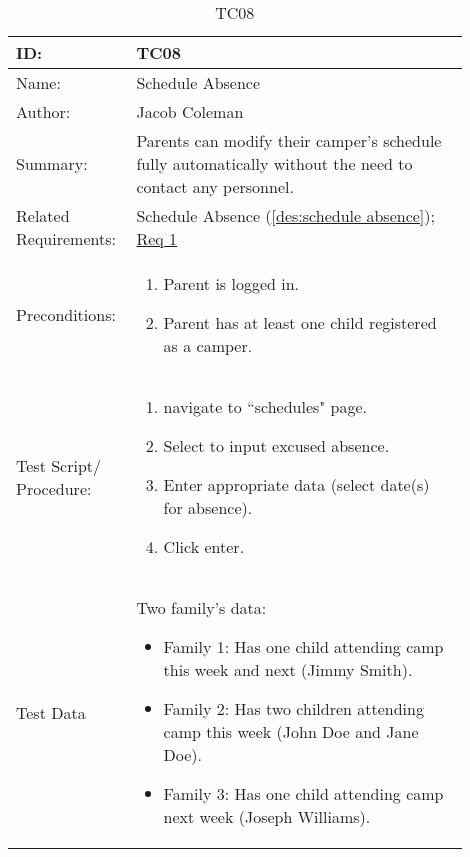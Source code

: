 \documentclass[11pt]{article}
\begin{document}
\begin{table}[H]
\begin{center}
\caption{TC08}
\label{TC08}
\begin{tabular}{p{0.20\linewidth}p{0.70\linewidth}}
	ID: & TC08\\\hline
	Name: & Schedule Absence \\\hline
	Author: & Jacob Coleman\\\hline
	Summary: & Parents can modify their camper's schedule fully automatically without the need to contact any personnel. \\\hline
	Related \hspace{5em} Requirements:& Schedule Absence (\cref{des:schedule absence}); \hyperlink{Req1}{Req 1}\\\hline
	Preconditions:& \begin{enumerate}[topsep=0pt] 
		\item Parent is logged in.
		\item Parent has at least one child registered as a camper.
	\end{enumerate}\\\hline
	Test Script/ Procedure: & \begin{enumerate}[topsep=0pt]
	\item navigate to ``schedules" page.
	\item Select to input excused absence.
	\item Enter appropriate data (select date(s) for absence).
	\item Click enter.
	\end{enumerate}\\\hline
	Test Data & \vspace*{.25em} Two family's data:
	\begin{itemize}[topsep=0pt]
		\item Family 1: Has one child attending camp this week and next (Jimmy Smith).
		\item Family 2: Has two children attending camp this week (John Doe and Jane Doe).
		\item Family 3: Has one child attending camp next week (Joseph Williams).
	\end{itemize}
\end{tabular}
\end{center}
\end{table}
\end{document}

